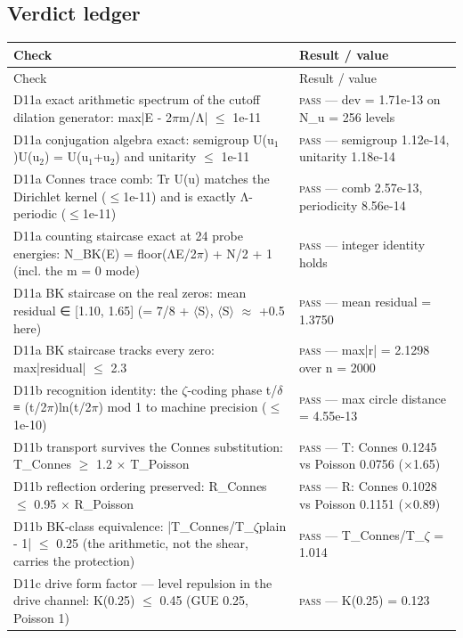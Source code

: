 \documentclass[11pt,a4paper]{article}
\begin{document}
\subsection{Verdict ledger}
\begin{longtable}{@{}p{}p{}@{}}
\toprule
Check & Result / value \\
\midrule
\endfirsthead
\toprule
Check & Result / value \\
\midrule
\endhead
\bottomrule
\endfoot
D11a exact arithmetic spectrum of the cutoff dilation generator: max|E - 2$\pi$m/Λ| $\le$ 1e-11 & \textsc{pass} --- dev = 1.71e-13 on N\_u = 256 levels \\
D11a conjugation algebra exact: semigroup U(u$_{1}$)U(u$_{2}$) = U(u$_{1}$+u$_{2}$) and unitarity $\le$ 1e-11 & \textsc{pass} --- semigroup 1.12e-14, unitarity 1.18e-14 \\
D11a Connes trace comb: Tr U(u) matches the Dirichlet kernel ($\le$1e-11) and is exactly Λ-periodic ($\le$1e-11) & \textsc{pass} --- comb 2.57e-13, periodicity 8.56e-14 \\
D11a counting staircase exact at 24 probe energies: N\_BK(E) = floor(ΛE/2$\pi$) + N/2 + 1 (incl. the m = 0 mode) & \textsc{pass} --- integer identity holds \\
D11a BK staircase on the real zeros: mean residual ∈ [1.10, 1.65] (= 7/8 + $\langle$S$\rangle$, $\langle$S$\rangle$ $\approx$ +0.5 here) & \textsc{pass} --- mean residual = 1.3750 \\
D11a BK staircase tracks every zero: max|residual| $\le$ 2.3 & \textsc{pass} --- max|r| = 2.1298 over n = 2000 \\
D11b recognition identity: the $\zeta$-coding phase t/$\delta$ ≡ (t/2$\pi$)ln(t/2$\pi$) mod 1 to machine precision ($\le$1e-10) & \textsc{pass} --- max circle distance = 4.55e-13 \\
D11b transport survives the Connes substitution: T\_Connes $\ge$ 1.2 $\times$ T\_Poisson & \textsc{pass} --- T: Connes 0.1245 vs Poisson 0.0756 ($\times$1.65) \\
D11b reflection ordering preserved: R\_Connes $\le$ 0.95 $\times$ R\_Poisson & \textsc{pass} --- R: Connes 0.1028 vs Poisson 0.1151 ($\times$0.89) \\
D11b BK-class equivalence: |T\_Connes/T\_$\zeta$plain - 1| $\le$ 0.25 (the arithmetic, not the shear, carries the protection) & \textsc{pass} --- T\_Connes/T\_$\zeta$ = 1.014 \\
D11c drive form factor — level repulsion in the drive channel: K(0.25) $\le$ 0.45 (GUE 0.25, Poisson 1) & \textsc{pass} --- K(0.25) = 0.123 \\

\end{longtable}
\end{document}
